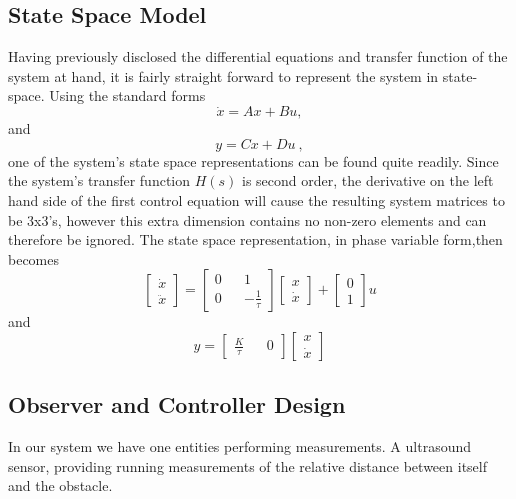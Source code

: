\documentclass[a4paper,onecolumn,amsmath,amssymb]{revtex4-1}
\begin{document}
\subsection{\textbf{State Space Model}}
Having previously disclosed the differential equations and transfer function of the system at hand, it is fairly straight forward to represent the system in state-space. Using the standard forms 
\begin{equation}
\dot x=Ax+Bu ,
\end{equation}
and
\begin{equation}
y=Cx+Du~,
\end{equation}
one of the system's state space representations can be found quite readily. Since the system's transfer function $H(s)$ is second order, the derivative on the left hand side of the first control equation will cause the resulting  system matrices to be 3x3's, however this extra dimension contains no non-zero elements and can therefore be ignored. The state space representation, in phase variable form,then becomes
\begin{equation}
\begin{bmatrix}
\dot x \\
\ddot x
\end{bmatrix}
=
\begin{bmatrix}
0 && 1 \\
0 && -\frac{1}{\tau}
\end{bmatrix}
\begin{bmatrix}
x \\ \dot x
\end{bmatrix}
+
\begin{bmatrix}
0\\ 1
\end{bmatrix}
u
\end{equation}
and
\begin{equation}
y=
 \begin{bmatrix}
\frac{K}{\tau}&& 0
\end{bmatrix}
\begin{bmatrix}
x \\ \dot x
\end{bmatrix}
\end{equation}
\subsection{\textbf{Observer and Controller Design}}
In our system we have one entities performing measurements. A ultrasound sensor, providing running measurements of the relative distance between itself and the obstacle.
\end{document}
